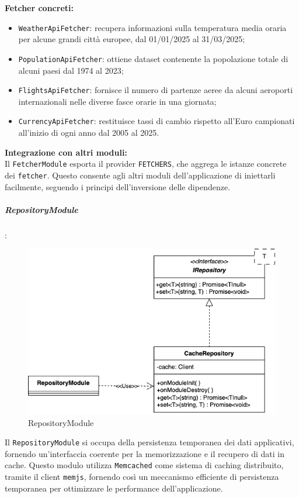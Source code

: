\textbf{Fetcher concreti:}
\begin{itemize}
    \item \texttt{WeatherApiFetcher}: recupera informazioni sulla temperatura media oraria per alcune grandi città europee, dal 01/01/2025 al 31/03/2025;
    \item \texttt{PopulationApiFetcher}: ottiene dataset contenente la popolazione totale di alcuni paesi dal 1974 al 2023;
    \item \texttt{FlightsApiFetcher}: fornisce il numero di partenze aeree da alcuni aeroporti internazionali nelle diverse fasce orarie in una giornata;
    \item \texttt{CurrencyApiFetcher}: restituisce tassi di cambio rispetto all'Euro campionati all'inizio di ogni anno dal 2005 al 2025.
\end{itemize}

\textbf{Integrazione con altri moduli:} \\
Il \texttt{FetcherModule} esporta il provider \texttt{FETCHERS}, che aggrega le istanze concrete dei \texttt{fetcher}. Questo consente agli altri moduli dell’applicazione di iniettarli facilmente, seguendo i principi dell’inversione delle dipendenze.

\subparagraph{RepositoryModule}:

\begin{figure}[H] 
    \centering
    \includegraphics[scale = 0.45]{template/images/uml_back/RepositoryModule.png}
    \caption{RepositoryModule}
\end{figure}

Il \texttt{RepositoryModule} si occupa della persistenza temporanea dei dati applicativi, fornendo un’interfaccia coerente per la memorizzazione e il recupero di dati in cache. Questo modulo utilizza \texttt{Memcached} come sistema di caching distribuito, tramite il client \texttt{memjs}, fornendo così un meccanismo efficiente di persistenza temporanea per ottimizzare le performance dell'applicazione.\\

